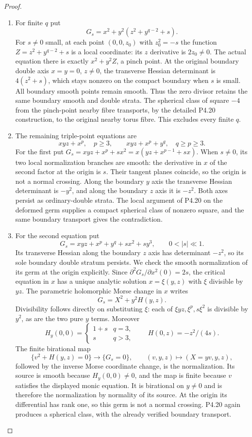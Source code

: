 \begin{proof}
\begin{enumerate}[label={$\langle1\rangle$\arabic*.},leftmargin=*]
\item For finite $q$ put
\[
 G_s=x^2+y^2(z^2+y^{q-2}+s).
\]
For $s\ne0$ small, at each point
$(0,0,z_0)$ with $z_0^2=-s$ the function
$Z=z^2+y^{q-2}+s$ is a local coordinate:
its $z$ derivative is $2z_0\ne0$.
The actual equation there is exactly
$x^2+y^2Z$, a pinch point. At the original
boundary double axis $x=y=0$, $z\ne0$,
the transverse Hessian determinant is
$4(z^2+s)$, which stays nonzero on the
compact boundary when $s$ is small.
All boundary smooth points remain smooth.
Thus the zero divisor retains the same
boundary smooth and double strata.
The spherical class of square $-4$
from the pinch-point nearby fibre transports,
by the detailed P4.20 construction, to
the original nearby torus fibre.
This excludes every finite $q$.

\item The remaining triple-point equations are
\[
 xyz+x^p,\quad p\ge3,\qquad
 xyz+x^p+y^q,\quad q\ge p\ge3.
\]
For the first put
$G_s=xyz+x^p+s x^2
=x(yz+x^{p-1}+s x)$.
When $s\ne0$, its two local normalization
branches are smooth: the derivative in $x$
of the second factor at the origin is $s$.
Their tangent planes coincide, so the
origin is not a normal crossing. Along
the boundary $y$ axis the transverse
Hessian determinant is $-y^2$, and along
the boundary $z$ axis it is $-z^2$.
Both axes persist as ordinary-double
strata. The local argument of P4.20 on
the deformed germ supplies a compact
spherical class of nonzero square, and
the same boundary transport gives the
contradiction.

\item For the second equation put
\[
 G_s=xyz+x^p+y^q+s x^2+s y^3,
 \qquad 0<|s|\ll1.
\]
Its transverse Hessian along the boundary
$z$ axis has determinant $-z^2$,
so its sole boundary double stratum
persists. We check the smooth normalization
of its germ at the origin explicitly.
Since $\partial^2G_s/\partial x^2(0)=2s$,
the critical equation in $x$ has a unique
analytic solution $x=\xi(y,z)$ with
$\xi$ divisible by $yz$. The parametric
holomorphic Morse change in $x$ writes
\[
 G_s=X^2+y^2H(y,z).
\]
Divisibility follows directly on substituting
$\xi$: each of $\xi yz,\xi^p,s\xi^2$
is divisible by $y^2$, as are the two
pure $y$ terms. Moreover
\[
 H_y(0,0)=
 \begin{cases}1+s&q=3,\\s&q>3,\end{cases}
 \qquad H(0,z)=-z^2/(4s).
\]
The finite
birational map
\[
 \{v^2+H(y,z)=0\}\longrightarrow\{G_s=0\},
 \qquad (v,y,z)\longmapsto(X=yv,y,z),
\]
followed by the inverse Morse coordinate
change, is the normalization. Its source
is smooth because $H_y(0,0)\ne0$,
and the map is finite because $v$
satisfies the displayed monic equation.
It is birational on $y\ne0$ and is
therefore the normalization by normality
of its source. At the origin its
differential has rank one, so this germ
is not a normal crossing. P4.20 again
produces a spherical class, with the
already verified boundary transport.


\end{enumerate}
\end{proof}
